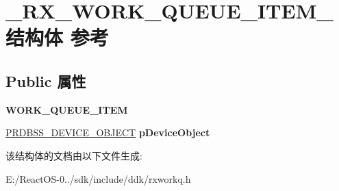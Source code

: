 \hypertarget{struct___r_x___w_o_r_k___q_u_e_u_e___i_t_e_m__}{}\section{\+\_\+\+R\+X\+\_\+\+W\+O\+R\+K\+\_\+\+Q\+U\+E\+U\+E\+\_\+\+I\+T\+E\+M\+\_\+结构体 参考}
\label{struct___r_x___w_o_r_k___q_u_e_u_e___i_t_e_m__}
\subsection*{Public 属性}
\begin{DoxyCompactItemize}
\item 
\mbox{\label{struct___r_x___w_o_r_k___q_u_e_u_e___i_t_e_m___afb19ecebe7a950bbae25cdf77cafec9d}} 
{\bfseries W\+O\+R\+K\+\_\+\+Q\+U\+E\+U\+E\+\_\+\+I\+T\+EM}
\item 
\mbox{\label{struct___r_x___w_o_r_k___q_u_e_u_e___i_t_e_m___ac3fb2c251a277261b392a0400fd88170}} 
\hyperlink{struct___r_d_b_s_s___d_e_v_i_c_e___o_b_j_e_c_t}{P\+R\+D\+B\+S\+S\+\_\+\+D\+E\+V\+I\+C\+E\+\_\+\+O\+B\+J\+E\+CT} {\bfseries p\+Device\+Object}
\end{DoxyCompactItemize}


该结构体的文档由以下文件生成\+:\begin{DoxyCompactItemize}
\item 
E\+:/\+React\+O\+S-\/0../sdk/include/ddk/rxworkq.\+h\end{DoxyCompactItemize}
